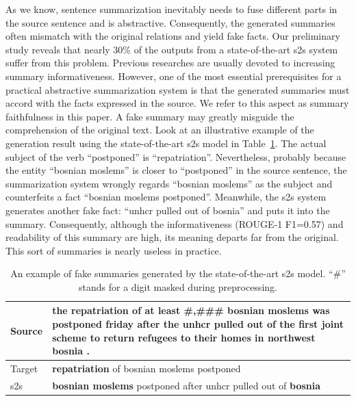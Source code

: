 \documentclass[letterpaper]{article} %
\begin{document}
As we know, sentence summarization inevitably needs to fuse different parts in the source sentence and is abstractive.
Consequently, the generated summaries often mismatch with the original relations and yield fake facts. 
Our preliminary study reveals that nearly 30\% of the outputs from a state-of-the-art s2s system suffer from this problem.
Previous researches are usually devoted to increasing summary informativeness. 
However, one of the most essential prerequisites for a practical abstractive summarization system is that the generated summaries must accord with the facts expressed in the source.
We refer to this aspect as summary faithfulness in this paper.
A fake summary may greatly misguide the comprehension of the original text.
Look at an illustrative example of the generation result using the state-of-the-art s2s model \cite{nallapati2016abstractive} in Table~\ref{tb:invalid_example}.
The actual subject of the verb ``postponed'' is ``repatriation''.
Nevertheless, probably because the entity ``bosnian moslems'' is closer to ``postponed'' in the source sentence, the summarization system wrongly regards ``bosnian moslems'' as the subject and counterfeits a fact ``bosnian moslems postponed''.
Meanwhile, the s2s system generates another fake fact: ``unhcr pulled out of bosnia'' and puts it into the summary.
Consequently, although the informativeness (ROUGE-1 F1=0.57) and readability of this summary are high, its meaning departs far from the original.
This sort of summaries is nearly useless in practice.
	
	\begin{table}
		\centering
		\begin{tabularx}{\linewidth}{p{1cm}|X}
			\hline
			Source & the repatriation of at least \#,\#\#\# bosnian moslems was postponed friday after the unhcr pulled out of the first joint scheme to return refugees to their homes in northwest bosnia . \\ \hline
			Target & \textbf{repatriation} of bosnian moslems postponed                                                                                       \\ \hline
			s2s & \textbf{bosnian moslems} postponed after unhcr pulled out of \textbf{bosnia}                                                                                  \\ \hline
		\end{tabularx}
		\caption{An example of fake summaries generated by the state-of-the-art s2s model. ``\#'' stands for a digit masked during preprocessing.}
		\label{tb:invalid_example}
	\end{table}
	
\end{document}
